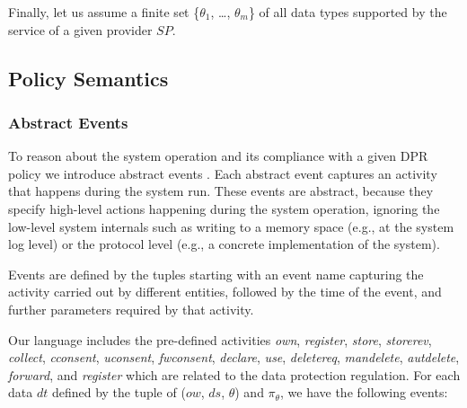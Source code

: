 \documentclass[a4paper]{article}
\begin{document}
Finally, let us assume a finite set \{$\theta_1$, \dots, $\theta_m$\} of all data types supported by the service of a given provider $SP$. 

\begin{figure}[htbp]
\centering
{}
\label{fig:polsp}
\end{figure}
   


\subsection{Policy Semantics}
\label{sec:semantic0} 

\subsubsection{Abstract Events}
\label{sec:aevents} 

To reason about the system operation and its compliance with a given DPR policy we introduce abstract events \cite{TaButin15}. Each abstract event captures an  activity that happens during the system run. These events are abstract, because they specify high-level actions happening during the system  operation, ignoring the low-level system internals such as writing to a memory space (e.g., at the system log level) or the protocol level (e.g., a concrete implementation of the system).
   
Events are defined by the tuples starting with an event name capturing the activity carried out by different entities, followed by the time of the event, and further parameters required by that activity.     

Our language includes the pre-defined activities \textit{own}, \textit{register}, \textit{store}, \textit{storerev}, \textit{collect},  \textit{cconsent}, \textit{uconsent}, \textit{fwconsent}, \textit{declare}, \textit{use}, \textit{deletereq}, \textit{mandelete}, \textit{autdelete}, \textit{forward}, and \textit{register} which are related to the data protection regulation. For each data $dt$ defined by the tuple of ($ow$, $ds$, $\theta$) and $\pi_{\theta}$, we have the following events: 
\end{document}
